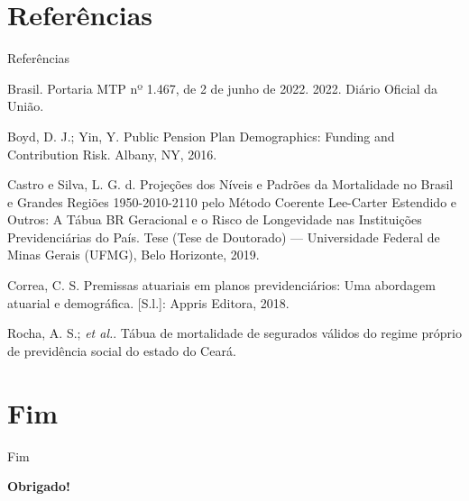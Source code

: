 \documentclass[11pt]{beamer}
\begin{document}
\section{Referências}
    \begin{frame}[allowframebreaks]{Referências}
    
        \scriptsize
        Brasil. Portaria MTP nº 1.467, de 2 de junho de 2022. 2022. Diário Oficial da União.  
        
        \medskip
        
        Boyd, D. J.; Yin, Y. Public Pension Plan Demographics: Funding and Contribution Risk. Albany, NY, 2016.  
        
        \medskip
        
        Castro e Silva, L. G. d. Projeções dos Níveis e Padrões da Mortalidade no Brasil e Grandes Regiões 1950-2010-2110 pelo Método Coerente Lee-Carter Estendido e Outros: A Tábua BR Geracional e o Risco de Longevidade nas Instituições Previdenciárias do País. Tese (Tese de Doutorado) — Universidade Federal de Minas Gerais (UFMG), Belo Horizonte, 2019.
        
        \medskip
        
        Correa, C. S. Premissas atuariais em planos previdenciários: Uma abordagem atuarial e demográfica. [S.l.]: Appris Editora, 2018.  
        
        \medskip
        
        Rocha, A. S.; \textit{et al.}. Tábua de mortalidade de segurados válidos do regime próprio de previdência social do estado do Ceará.  
    
    \end{frame}

\section{Fim}
    \begin{frame}{Fim}
            \begin{center}
                \textbf{Obrigado!}
            \end{center}
    \end{frame}
\end{document}
